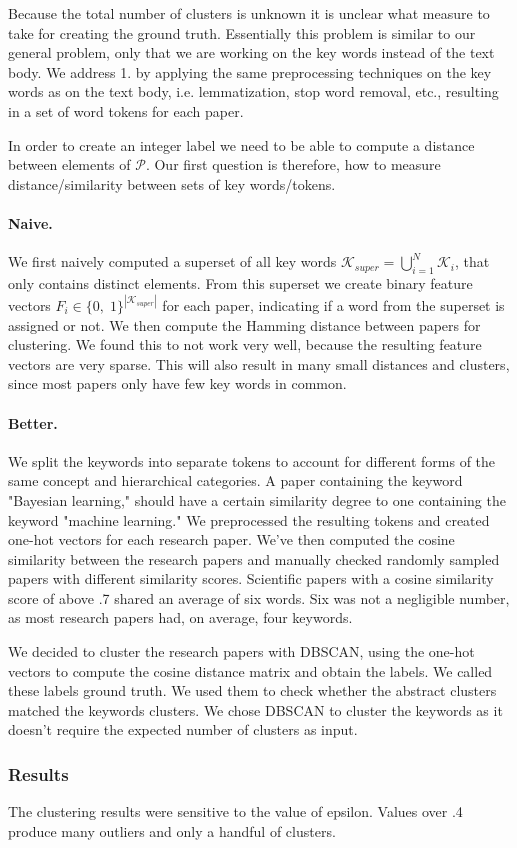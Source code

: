 Because the total number of clusters is unknown it is unclear what measure to take for creating the ground truth. Essentially this problem is similar to our general problem, only that we are working on the key words instead of the text body. We address 1. by applying the same preprocessing techniques on the key words as on the text body, i.e. lemmatization, stop word removal, etc., resulting in a set of word tokens for each paper.

In order to create an integer label we need to be able to compute a distance between elements of $ \mathcal{P} $. Our first question is therefore, how to measure distance/similarity between sets of key words/tokens. 

\paragraph{Naive.}
We first naively computed a superset of all key words $ \mathcal{K}_{super} = \bigcup_{i=1}^{N} \mathcal{K}_{i} $, that only contains distinct elements. From this superset we create binary feature vectors $ F_{i} \in \{0,\; 1 \}^{|\mathcal{K}_{super}|} $ for each paper, indicating if a word from the superset is assigned or not. We then compute the Hamming distance between papers for clustering. We found this to not work very well, because the resulting feature vectors are very sparse. This will also result in many small distances and clusters, since most papers only have few key words in common. 

\paragraph{Better.}
We split the keywords into separate tokens to account for different forms of the same concept and hierarchical categories. A paper containing the keyword "Bayesian learning," should have a certain similarity degree to one containing the keyword "machine learning." We preprocessed the resulting tokens and created one-hot vectors for each research paper. We've then computed the cosine similarity between the research papers and manually checked randomly sampled papers with different similarity scores. Scientific papers with a cosine similarity score of above .7 shared an average of six words. Six was not a negligible number, as most research papers had, on average, four keywords. 

We decided to cluster the research papers with DBSCAN, using the one-hot vectors to compute the cosine distance matrix and obtain the labels. We called these labels ground truth. We used them to check whether the abstract clusters matched the keywords clusters. We chose DBSCAN to cluster the keywords as it doesn't require the expected number of clusters as input. 

\subsubsection{Results}
The clustering results were sensitive to the value of epsilon. Values over .4 produce many outliers and only a handful of clusters. 